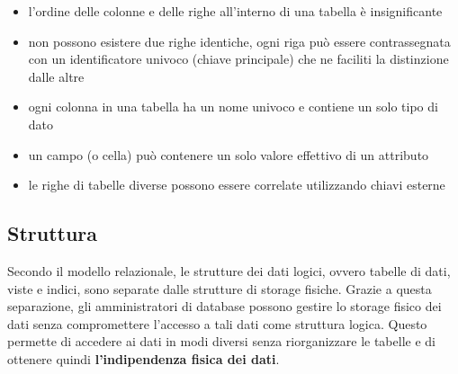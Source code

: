 \begin{itemize}
    \item l'ordine delle colonne e delle righe all'interno di una tabella è insignificante
    \item non possono esistere due righe identiche, ogni riga può essere contrassegnata con un identificatore univoco (chiave principale) che ne faciliti la distinzione dalle altre
    \item  ogni colonna in una tabella ha un nome univoco e contiene un solo tipo di dato
    \item un campo (o cella) può contenere un solo valore effettivo di un attributo
    \item le righe di tabelle diverse possono essere correlate utilizzando chiavi esterne
\end{itemize}

\subsection{Struttura}
Secondo il modello relazionale, le strutture dei dati logici, ovvero tabelle di dati, viste e indici, sono separate dalle strutture di storage fisiche. Grazie a questa separazione, gli amministratori di database possono gestire lo storage fisico dei dati senza compromettere l'accesso a tali dati come struttura logica. Questo permette di accedere ai dati in modi diversi senza riorganizzare le tabelle e di ottenere quindi \textbf{l'indipendenza fisica dei dati}.

